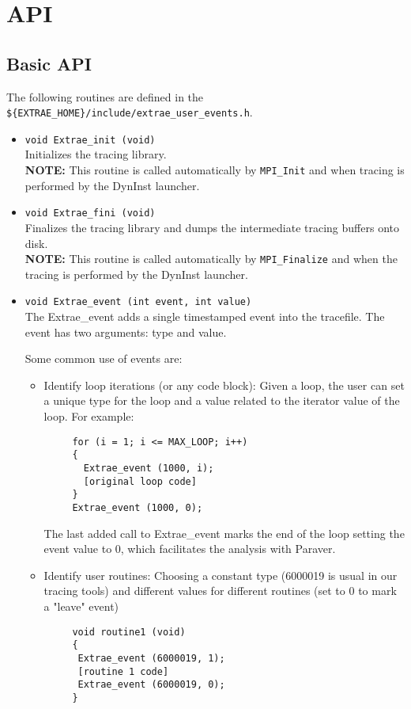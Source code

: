 \chapter{\TRACE API}\label{cha:API}

\section{Basic API}\label{sec:BasicAPI}

The following routines are defined in the {\tt \$\{EXTRAE\_HOME\}/include/extrae\_user\_events.h}.

\begin{itemize}

 \item {\tt void Extrae\_init (void)}\\
 Initializes the tracing library.\\
 {\bf NOTE:} This routine is called automatically by {\tt MPI\_Init} and when tracing is performed by the DynInst launcher.

 \item {\tt void Extrae\_fini (void)}\\
 Finalizes the tracing library and dumps the intermediate tracing buffers onto disk.\\
 {\bf NOTE:} This routine is called automatically by {\tt MPI\_Finalize} and when the tracing is performed by the DynInst launcher.

 \item {\tt void Extrae\_event (int event, int value)}\\
 The Extrae\_event adds a single timestamped event into the tracefile. The event has two arguments: type and value.

 Some common use of events are:
  \begin{itemize}
   \item Identify loop iterations (or any code block): Given a loop, the user can set a unique type for the loop and a value related to the iterator value of the loop. For example:
    \begin{verbatim}
     for (i = 1; i <= MAX_LOOP; i++)
     {
       Extrae_event (1000, i);
       [original loop code]
     }
     Extrae_event (1000, 0);
    \end{verbatim}
   The last added call to Extrae\_event marks the end of the loop setting the event value to 0, which facilitates the analysis with Paraver.
   \item Identify user routines: Choosing a constant type (6000019 is usual in our tracing tools) and different values for different routines (set to 0 to mark a "leave" event) 
    \begin{verbatim}
     void routine1 (void)
     {
      Extrae_event (6000019, 1);
      [routine 1 code]
      Extrae_event (6000019, 0);
     }


\end{verbatim}
\end{itemize}
\end{itemize}
